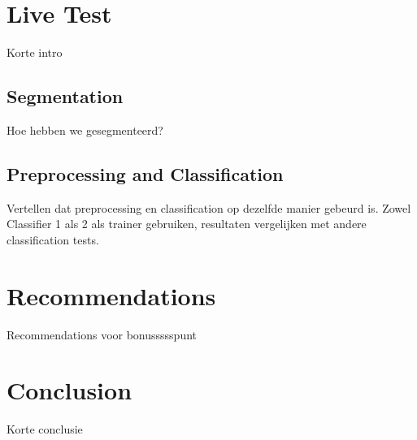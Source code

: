 \documentclass[11pt,twoside,a4paper]{article}
\begin{document}
\section{Live Test}
Korte intro

\subsection{Segmentation}
Hoe hebben we gesegmenteerd?

\subsection{Preprocessing and Classification}
Vertellen dat preprocessing en classification op dezelfde manier gebeurd is.
Zowel Classifier 1 als 2 als trainer gebruiken, resultaten vergelijken met andere classification tests.

\section{Recommendations}
Recommendations voor bonussssspunt

\section{Conclusion}
Korte conclusie
\end{document}
